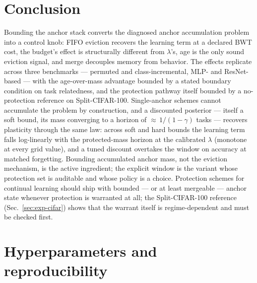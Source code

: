 \documentclass[review,12pt,number]{elsarticle}
\begin{document}
\section{Conclusion}
\label{sec:conclusion}

Bounding the anchor stack converts the diagnosed anchor accumulation
problem into a control knob: FIFO eviction recovers the learning
term at a declared BWT cost, the budget's effect is structurally
different from $\lambda$'s, age is the only sound eviction signal,
and merge decouples memory from behavior. The effects replicate
across three benchmarks --- permuted and class-incremental, MLP- and
ResNet-based --- with the age-over-mass advantage bounded by a stated
boundary condition on task relatedness, and the protection pathway
itself bounded by a no-protection reference on Split-CIFAR-100.
Single-anchor schemes cannot accumulate the problem by construction,
and a discounted posterior --- itself a soft bound, its mass
converging to a horizon of ${\approx}\,1/(1-\gamma)$ tasks --- recovers
plasticity through the same law: across soft and hard bounds the
learning term falls log-linearly with the protected-mass horizon at
the calibrated $\lambda$ (monotone at every grid value), and a tuned
discount overtakes the window on accuracy at matched forgetting.
Bounding accumulated anchor mass, not the eviction mechanism, is the
active ingredient; the explicit window is the variant whose protection
set is auditable and whose policy is a choice.
Protection schemes for
continual learning should ship with bounded --- or at least
mergeable --- anchor state whenever protection is warranted at all;
the Split-CIFAR-100 reference (Sec.~\ref{sec:exp-cifar}) shows that
the warrant itself is regime-dependent and must be checked first.

\appendix
\section{Hyperparameters and reproducibility}
\end{document}
